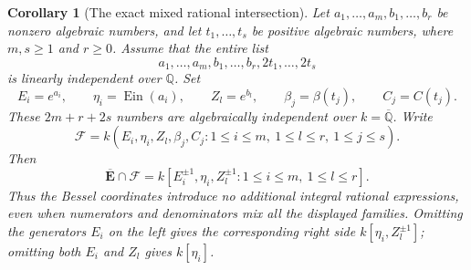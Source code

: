 \documentclass[11pt]{article}
\newtheorem{corollary}[theorem]{Corollary}
\theoremstyle{definition}
\theoremstyle{remark}
\newcommand{\Ebar}{\overline{\mathbf E}}
\newcommand{\Ein}{\operatorname{Ein}}
\begin{document}
\begin{corollary}[The exact mixed rational intersection]
\label{ncr:main}
Let $a_1,\ldots,a_m,b_1,\ldots,b_r$ be nonzero algebraic numbers,
and let $t_1,\ldots,t_s$ be positive algebraic numbers, where
$m,s\ge1$ and $r\ge0$. Assume that the entire list
\[
 a_1,\ldots,a_m,b_1,\ldots,b_r,2t_1,\ldots,2t_s
\]
is linearly independent over $\mathbb Q$. Set
\[
 E_i=e^{a_i},\qquad \eta_i=\Ein(a_i),\qquad
 Z_l=e^{b_l},\qquad \beta_j=\beta(t_j),\qquad C_j=C(t_j).
\]
These $2m+r+2s$ numbers are algebraically independent over
$k=\overline{\mathbb Q}$.  Write
\[
 \mathcal F=k(E_i,\eta_i,Z_l,\beta_j,C_j:
                  1\le i\le m,\ 1\le l\le r,\ 1\le j\le s).
\]
Then
\begin{equation}\label{ncr:intersection}
 \boxed{\quad \Ebar\cap\mathcal F
 =k[E_i^{\pm1},\eta_i,Z_l^{\pm1}:1\le i\le m,\ 1\le l\le r].\quad}
\end{equation}
Thus the Bessel coordinates introduce no additional integral rational
expressions, even when numerators and denominators mix all the displayed
families. Omitting the generators $E_i$ on the left gives the corresponding
right side $k[\eta_i,Z_l^{\pm1}]$; omitting both $E_i$ and $Z_l$ gives
$k[\eta_i]$.
\end{corollary}
\end{document}
